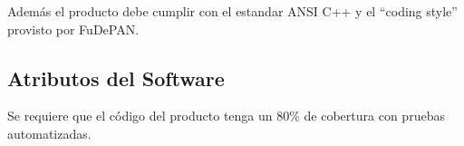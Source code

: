 \documentclass[10pt,a4paper]{article}
\begin{document}
    Adem\'as el producto debe cumplir con el estandar ANSI C++ y el ``coding
style'' provisto por FuDePAN.

  \subsection{Atributos del Software}
    Se requiere que el c\'odigo del producto tenga un 80\% de cobertura con
pruebas automatizadas.

\pagebreak

\begin{appendices} 
  
       
\end{appendices}
\end{document}
